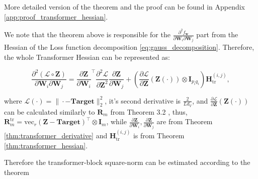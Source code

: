 \documentclass{article}
\begin{document}
More detailed version of the theorem and the proof can be found in Appendix \ref{app:proof_transformer_hessian}.

We note that the theorem above is responsible for the $\frac{\partial^2 f_{\mathbf{w}}}{\partial \mathbf{W}_i \partial \mathbf{W}_j}$ part from the Hessian of the Loss function decomposition \ref{eq:gauss_decomposition}. Therefore, the whole Transformer Hessian can be represented as:

\begin{equation} \label{eq:transformer_decomposition}
\frac{\partial^2 (\mathcal{L} \circ \mathbf{Z})}{\partial \mathbf{W}_i \partial \mathbf{W}_j} = \frac{\partial \mathbf{Z}}{\partial \mathbf{W}_i} ^\top \frac{\partial^2 \mathcal{L}}{\partial \mathbf{Z}^2} \frac{\partial \mathbf{Z}}{\partial \mathbf{W}_j} + \left( \frac{\partial \mathcal{L}}{\partial \mathbf{Z}} (\mathbf{Z}(\cdot)) \otimes \mathbf{I}_{p_i q_i} \right) \mathbf{H}_{\text{tr}}^{(i,j)},
\end{equation}

where $\mathcal{L}(\cdot) = \| \cdot - \textbf{Target} \|^2_2$, it's second derivative is $\frac{2}{Ld_V}$, and $\frac{\partial \mathcal{L}}{\partial \mathbf{Z}} (\mathbf{Z}(\cdot))$ can be calculated similarly to $\mathbf{R}_m$ from Theorem 3.2 \cite{ormaniec2024attentionhessian}, thus, $\mathbf{R}^{\text{tr}}_m = \mathrm{vec}_r(\mathbf{Z} - \textbf{Target})^\top \otimes \mathbf{I}_m$, while $\frac{\partial \mathbf{Z}}{\partial \mathbf{W}_i}, \frac{\partial \mathbf{Z}}{\partial \mathbf{W}_j}$ are from Theorem \ref{thm:transformer_derivative} and $\mathbf{H}_{\text{tr}}^{(i,j)}$ is from Theorem \ref{thm:transformer_hessian}.


Therefore the transformer-block square-norm can be estimated according to the theorem 
\end{document}
